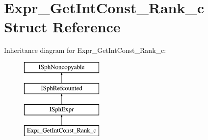 \hypertarget{structExpr__GetIntConst__Rank__c}{\section{Expr\-\_\-\-Get\-Int\-Const\-\_\-\-Rank\-\_\-c Struct Reference}
\label{structExpr__GetIntConst__Rank__c}
}
Inheritance diagram for Expr\-\_\-\-Get\-Int\-Const\-\_\-\-Rank\-\_\-c\-:\begin{figure}[H]
\begin{center}
\leavevmode
\includegraphics[height=4.000000cm]{structExpr__GetIntConst__Rank__c}
\end{center}
\end{figure}
